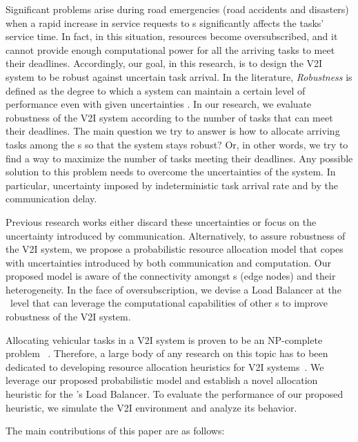 Significant problems arise during road emergencies (\eg road accidents and disasters) when a rapid increase in service requests to \bs s significantly affects the tasks' service time. In fact, in this situation, \bs resources become oversubscribed, and it cannot provide enough computational power for all the arriving tasks to meet their deadlines. Accordingly, our goal, in this research, is to design the V2I system to be robust against uncertain task arrival. In the literature, \emph{Robustness} is defined as the degree to which a system can maintain a certain level of performance even with given uncertainties \cite{ali2004measuring,smith2009robust,canon2010evaluation}. In our research, we evaluate robustness of the V2I system according to the number of tasks that can meet their deadlines. The main question we try to answer is how to allocate arriving tasks among the \bs s so that the system stays robust? Or, in other words, we try to find a way to maximize the number of tasks meeting their deadlines. Any possible solution to this problem needs to overcome the uncertainties of the system. In particular, uncertainty imposed by indeterministic task arrival rate and by the communication delay. 

Previous research works either discard these uncertainties\cite{bok2016multiple} or focus on the uncertainty introduced by communication\cite{ali2011co}. Alternatively, to assure robustness of the V2I system, we propose a probabilistic resource allocation model that copes with uncertainties introduced by both communication and computation. Our proposed model is aware of the connectivity amongst \bs s (\ie edge nodes) and their heterogeneity. In the face of oversubscription, we devise a Load Balancer at the \bs~level that can leverage the computational capabilities of other \bs s to improve robustness of the V2I system.

Allocating vehicular tasks in a V2I system is proven to be an NP-complete problem~\cite{Ullman1975} \cite{Lenstra1981}. Therefore, a large body of any research on this topic has to been dedicated to developing resource allocation heuristics for V2I systems~\cite{ali2004measuring,yu2016optimal,khemka2014utility,Lenstra1981,li2017resource,pyun2016,liu2010rsu}. We leverage our proposed probabilistic model and establish a novel allocation heuristic for the \bs 's Load Balancer. To evaluate the performance of our proposed heuristic, we simulate the V2I environment and analyze its behavior.

The main contributions of this paper are as follows:

